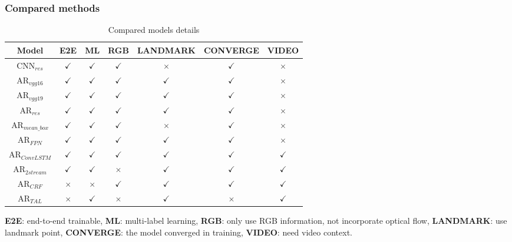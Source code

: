 \documentclass[5p,twocolumn]{elsarticle}
\begin{document}
\subsubsection{Compared methods} 
\begin{table}[htp]
	\scriptsize	
	\caption{Compared models details}
	\label{tab:comparative_models}
	\centering
	\tabcolsep=0.15cm
	
	\begin{tabular}{ccccccc}
		\toprule
		\textbf{Model} & \textbf{E2E} & \textbf{ML} & \textbf{RGB} & \textbf{LANDMARK} & \textbf{CONVERGE} & \textbf{VIDEO} \\
		\midrule
		CNN$_{res}$ & $\checkmark$ &  $\checkmark$ & $\checkmark$ & $\times$ & $\checkmark$ & $\times$  \\
		AR$_{vgg16}$ & $\checkmark$ &  $\checkmark$ & $\checkmark$ & $\checkmark$ & $\checkmark$ & $\times$ \\
		AR$_{vgg19}$ & $\checkmark$ &  $\checkmark$ & $\checkmark$ & $\checkmark$ & $\checkmark$ & $\times$ \\
		AR$_{res}$ & $\checkmark$ &  $\checkmark$ & $\checkmark$ & $\checkmark$ & $\checkmark$ & $\times$ \\
		AR$_{mean\_box}$ & $\checkmark$ &  $\checkmark$ & $\checkmark$ & $\times$ & $\checkmark$ & $\times$ \\
		AR$_{FPN}$ & $\checkmark$ &  $\checkmark$ & $\checkmark$ & $\checkmark$ & $\checkmark$ & $\times$ \\
		AR$_{ConvLSTM}$ & $\checkmark$ & $\checkmark$ & $\checkmark$ & $\checkmark$ & $\checkmark$ & $\checkmark$ \\
		AR$_{2stream}$ & $\checkmark$ & $\checkmark$ & $\times$ & $\checkmark$ & $\checkmark$ & $\checkmark$ \\
		AR$_{CRF}$ & $\times$ & $\times$ & $\checkmark$ & $\checkmark$ & $\checkmark$ & $\checkmark$ \\
		AR$_{TAL}$ & $\times$ & $\checkmark$ & $\times$ & $\checkmark$ & $\times$ & $\checkmark$ \\
		\bottomrule
	\end{tabular}
	
	{\footnotesize * \textbf{E2E}: end-to-end trainable, \textbf{ML}: multi-label learning, \textbf{RGB}: only use RGB information, not incorporate optical flow, \textbf{LANDMARK}: use landmark point, \textbf{CONVERGE}: the model converged in training, \textbf{VIDEO}: need video context.}
\end{table}
\end{document}
